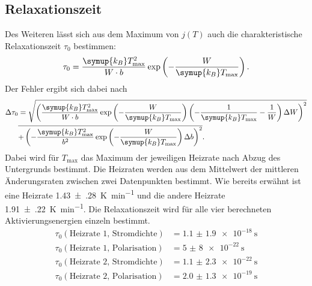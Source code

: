 \subsection{Relaxationszeit}
\label{sec:relax}
Des Weiteren lässt sich aus dem Maximum von $j(T)$ auch die charakteristische Relaxationszeit $\tau_0$
bestimmen:
\begin{equation}
    \label{eqn:tau0}
    \tau_0 = \frac{\symup{k_B}T_\text{max}^2}{W \cdot b} \exp\left(-\frac{W}{\symup{k_B}T_\text{max}} \right).
\end{equation}
Der Fehler ergibt sich dabei nach
\begin{align*}
    \label{eqn:FehlerTau}
    \Delta \tau_0 & =\sqrt{\left(\frac{\symup{k_B} T_\text{max}^2}{W \cdot b} \exp\left(-\frac{W}{\symup{k_B} T_\text{max}}\right)\left(-\frac{1}{\symup{k_B}T_\text{max}} - \frac{1}{W} \right) \Delta W \right)^2} \\
    &\overline{+ \left(-\frac{\symup{k_B} T_\text{max}^2}{b^2} \exp\left(-\frac{W}{\symup{k_B} T_\text{max}}\right)\Delta b \right)^2}.
\end{align*}
Dabei wird für $T_\text{max}$ das Maximum der jeweiligen Heizrate nach Abzug des Untergrunds bestimmt.
Die Heizraten werden aus dem Mittelwert der mittleren Änderungsraten zwischen zwei Datenpunkten bestimmt.
Wie bereits erwähnt ist eine Heizrate \SI{1.43(28)}{\kelvin\per\minute} und die andere Heizrate \SI{1.91(22)}{\kelvin\per\minute}.
Die Relaxationszeit wird für alle vier berechneten Aktivierungsenergien einzeln bestimmt.
\begin{align*}
  \tau_0(\text{Heizrate 1, Stromdichte}) &= \SI{1.1(19)e-18}{\second} \\
  \tau_0(\text{Heizrate 1, Polarisation}) &= \SI{5(8)e-22}{\second} \\
  \tau_0(\text{Heizrate 2, Stromdichte}) &= \SI{1.1(23)e-22}{\second} \\
  \tau_0(\text{Heizrate 2, Polarisation}) &= \SI{2.0(13)e-19}{\second} \\
\end{align*}
